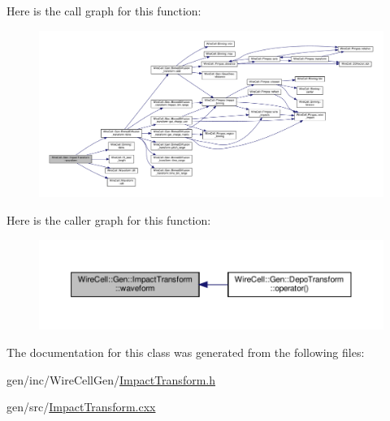 Here is the call graph for this function\+:
\nopagebreak
\begin{figure}[H]
\begin{center}
\leavevmode
\includegraphics[width=350pt]{class_wire_cell_1_1_gen_1_1_impact_transform_ad65b81bab03b2a6f8836782c732556bc_cgraph}
\end{center}
\end{figure}
Here is the caller graph for this function\+:
\nopagebreak
\begin{figure}[H]
\begin{center}
\leavevmode
\includegraphics[width=350pt]{class_wire_cell_1_1_gen_1_1_impact_transform_ad65b81bab03b2a6f8836782c732556bc_icgraph}
\end{center}
\end{figure}


The documentation for this class was generated from the following files\+:\begin{DoxyCompactItemize}
\item 
gen/inc/\+Wire\+Cell\+Gen/\hyperlink{_impact_transform_8h}{Impact\+Transform.\+h}\item 
gen/src/\hyperlink{_impact_transform_8cxx}{Impact\+Transform.\+cxx}\end{DoxyCompactItemize}
